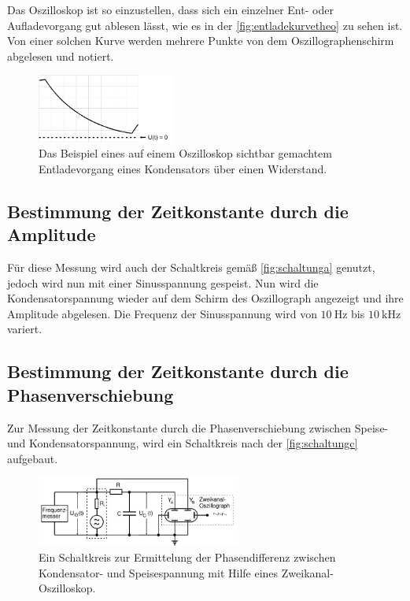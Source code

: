     \noindent Das Oszilloskop ist so einzustellen, dass sich ein einzelner Ent- oder Aufladevorgang gut ablesen lässt, wie es in der \autoref{fig:entladekurvetheo}
    zu sehen ist. Von einer solchen Kurve werden mehrere Punkte von dem Oszillographenschirm abgelesen und notiert.

    \begin{figure}
        \centering
        \includegraphics[width=0.4\textwidth]{bilder/Entladekurve.PNG}
        \caption{Das Beispiel eines auf einem Oszilloskop sichtbar gemachtem Entladevorgang eines Kondensators über einen Widerstand. \cite{anleitung}}
        \label{fig:entladekurvetheo}
    \end{figure}


\subsection{Bestimmung der Zeitkonstante durch die Amplitude}

    Für diese Messung wird auch der Schaltkreis gemäß \autoref{fig:schaltunga} genutzt, jedoch wird nun mit einer Sinusspannung gespeist. Nun wird die 
    Kondensatorspannung wieder auf dem Schirm des Oszillograph angezeigt und ihre Amplitude abgelesen. Die Frequenz der Sinusspannung wird von 
    $\SI{10}{\hertz}$ bis $\SI{10}{\kilo\hertz}$ variert. 


\subsection{Bestimmung der Zeitkonstante durch die Phasenverschiebung}
\label{subsec:Phasenverschiebung}

    Zur Messung der Zeitkonstante durch die Phasenverschiebung zwischen Speise- und Kondensatorspannung, wird ein Schaltkreis nach der \autoref{fig:schaltungc}
    aufgebaut. 

    \begin{figure}[H]
        \centering
        \includegraphics[width=0.6\textwidth]{bilder/aufbau_schaltungc.jpg}
        \caption{Ein Schaltkreis zur Ermittelung der Phasendifferenz zwischen Kondensator- und Speisespannung mit Hilfe eines Zweikanal-Oszilloskop. \cite{anleitung}}
        \label{fig:schaltungc}
    \end{figure}

